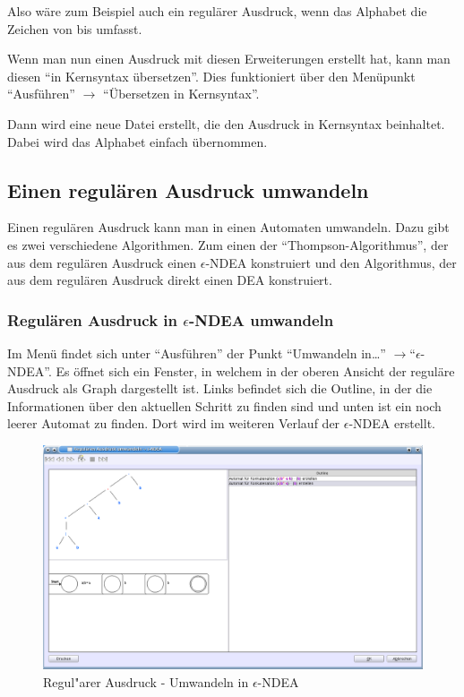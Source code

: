 Also wäre zum Beispiel auch \Symbol{[a-z]} ein regulärer Ausdruck, wenn das Alphabet die Zeichen von  bis  umfasst.

Wenn man nun einen Ausdruck mit diesen Erweiterungen erstellt hat, kann man diesen "`in Kernsyntax übersetzen"'. Dies funktioniert über den Menüpunkt "`Ausführen"' $\rightarrow$ "`Übersetzen in Kernsyntax"'.

Dann wird eine neue Datei erstellt, die den Ausdruck in Kernsyntax beinhaltet. Dabei wird das Alphabet einfach übernommen.

\subsection{Einen regulären Ausdruck umwandeln}

Einen regulären Ausdruck kann man in einen Automaten umwandeln. Dazu gibt es zwei verschiedene Algorithmen. Zum einen der "`Thompson-Algorithmus"', der aus dem regulären Ausdruck einen $\epsilon$-NDEA konstruiert und den Algorithmus, der aus dem regulären Ausdruck direkt einen DEA konstruiert.

\subsubsection{Regulären Ausdruck in $\epsilon$-NDEA umwandeln}

Im Menü findet sich unter "`Ausführen"' der Punkt "`Umwandeln in\ldots"' $\rightarrow$"`$\epsilon$-NDEA"'. Es öffnet sich ein Fenster, in welchem in der oberen Ansicht der reguläre Ausdruck als Graph dargestellt ist. Links befindet sich die Outline, in der die Informationen über den aktuellen Schritt zu finden sind und unten ist ein noch leerer Automat zu finden. Dort wird im weiteren Verlauf der $\epsilon$-NDEA erstellt.

\begin{figure}[h]
\begin{center}
\includegraphics[width=12cm]{../images/regex_to_enfa.png}
\caption{Regul"arer Ausdruck - Umwandeln in $\epsilon$-NDEA}
\end{center}
\end{figure}

